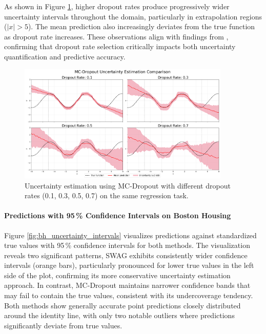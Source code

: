 As shown in Figure \ref{fig:dropoutrate_comparison}, higher dropout rates produce progressively wider
uncertainty intervals throughout the domain, particularly in extrapolation regions ($|x| > 5$). The mean
prediction also increasingly deviates from the true function as dropout rate increases. These observations
align with findings from \citet{verdoja2021behaviormcdropout}, confirming that dropout rate selection
critically impacts both uncertainty quantification and predictive accuracy.

\FloatBarrier

\begin{figure}[ht]
    \centering
    \includegraphics[width=0.9\textwidth]{plots/mcd_reg_comparison_2x2.png}
    \caption{Uncertainty estimation using MC-Dropout with different dropout rates (0.1, 0.3, 0.5, 0.7) on the same regression task.}
    \label{fig:dropoutrate_comparison}
\end{figure}

\FloatBarrier

\paragraph{Predictions with 95\,\% Confidence Intervals on Boston Housing}
Figure \ref{fig:bh_uncertainty_intervals} visualizes predictions against standardized true values with 95\,\% confidence intervals for both methods. The visualization reveals two significant patterns, SWAG exhibits consistently wider confidence intervals (orange bars), particularly pronounced for lower true values in the left side of the plot, confirming its more conservative uncertainty estimation approach. In contrast, MC-Dropout maintains narrower confidence bands that may fail to contain the true values, consistent with its undercoverage tendency. Both methods show generally accurate point predictions closely distributed around the identity line, with only two notable outliers where predictions significantly deviate from true values.

